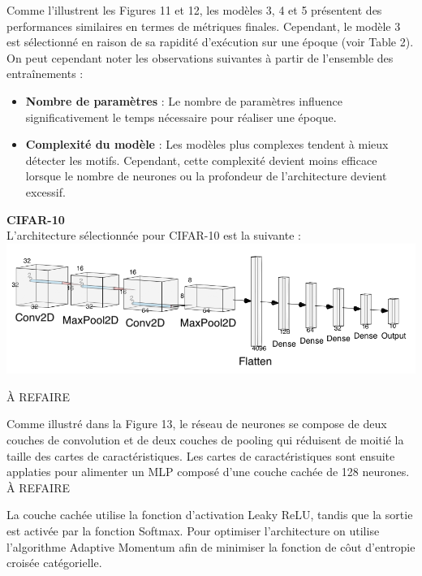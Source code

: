 \begin{multicols}{2}
Comme l’illustrent les Figures 11 et 12, les modèles 3, 4 et 5 présentent des performances similaires en termes de 
métriques finales. Cependant, le modèle 3 est sélectionné en raison de sa rapidité d’exécution sur une 
époque (voir Table 2). \\

On peut cependant noter les observations suivantes à partir de l’ensemble des entraînements :
\begin{itemize}
\item \textbf{Nombre de paramètres} : Le nombre de paramètres influence significativement le temps nécessaire pour réaliser une époque.
\item \textbf{Complexité du modèle} : Les modèles plus complexes tendent à mieux détecter les motifs. Cependant, cette complexité devient moins efficace 
lorsque le nombre de neurones ou la profondeur de l’architecture devient excessif.
\end{itemize} 
\hfill\break

\textbf{CIFAR-10} \\

L'architecture sélectionnée pour CIFAR-10 est la suivante : \\

\includegraphics[width=\columnwidth]{images/cifar10_nn.png}
\hfill\break


À REFAIRE

Comme illustré dans la Figure 13, le réseau de neurones se compose de deux couches de 
convolution et de deux couches de pooling qui réduisent de moitié la taille des cartes de caractéristiques. 
Les cartes de caractéristiques sont ensuite applaties pour alimenter un MLP composé d'une couche cachée de 128 neurones. \\

À REFAIRE

La couche cachée utilise la fonction d’activation Leaky ReLU, 
tandis que la sortie est activée par la fonction Softmax. Pour optimiser l'architecture
on utilise l'algorithme Adaptive Momentum afin de minimiser la fonction de côut 
d'entropie croisée catégorielle. \\


\end{multicols}

